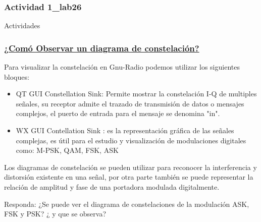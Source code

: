 \subsubsection{Actividad 1_lab26}

\begin{frame}

\begin{block}{}
\centering
\vspace{8mm}
\Large{Actividades}
\vspace{8mm}
\end{block}
\end{frame}

\begin{frame}


\frametitle{\underline{\textbf{¿Comó Observar un diagrama de constelación?}}}

\begin{flushleft}
Para visualizar la constelación en Gnu-Radio podemos utilizar los siguientes bloques:
\end{flushleft}
  
\begin{itemize}
\item {
QT GUI Constellation Sink: Permite mostrar la constelación I-Q de multiples señales, su   receptor admite el trazado de transmisión de datos o mensajes complejos, el puerto de entrada para el mensaje se denomina "in". }
\end{itemize}
\begin{itemize}
\item {
WX GUI Contellation Sink : es la representación gráfica de las señales complejas, es  útil  para  el  estudio  y  visualización  de  modulaciones digitales  como:  M-PSK, QAM, FSK, ASK}
\end{itemize}
\end{frame}

\begin{frame}
\begin{flushleft}
Los diagramas de constelación se pueden utilizar para reconocer la interferencia y distorsión existente en una señal, por otra parte también se puede representar la relación de amplitud y fase de una portadora modulada digitalmente. 
\item Responda: ¿Se puede ver el diagrama de constelaciones de la modulación ASK, FSK y PSK?
 ¿ y que se observa?
\end{flushleft}
\end{frame}


